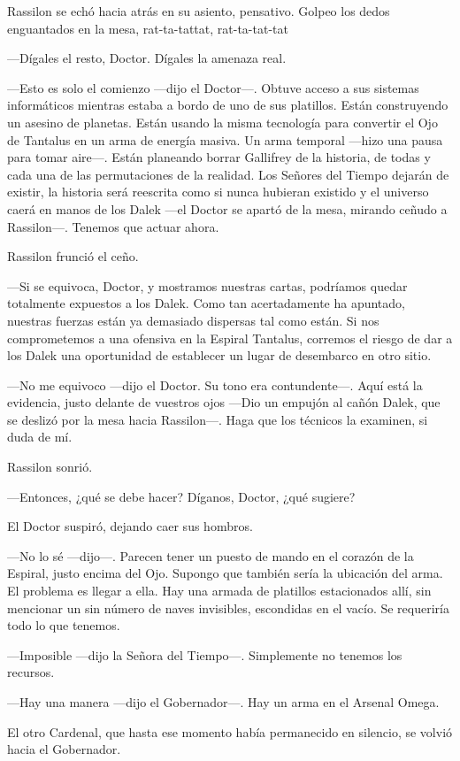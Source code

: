 Rassilon se echó hacia atrás en su asiento, pensativo. Golpeo los dedos enguantados en la mesa, rat-ta-tattat, rat-ta-tat-tat 

—Dígales el resto, Doctor. Dígales la amenaza real.

—Esto es solo el comienzo —dijo el Doctor—. Obtuve acceso a sus sistemas informáticos mientras estaba a bordo de uno de sus platillos. Están construyendo un asesino de planetas. Están usando la misma tecnología para convertir el Ojo de Tantalus en un arma de energía masiva. Un arma temporal —hizo una pausa para tomar aire—. Están planeando borrar Gallifrey de la historia, de todas y cada una de las permutaciones de la realidad. Los Señores del Tiempo dejarán de existir, la historia será reescrita como si nunca hubieran existido y el universo caerá en manos de los Dalek —el Doctor se apartó de la mesa, mirando ceñudo a Rassilon—. Tenemos que actuar ahora.

Rassilon frunció el ceño. 

—Si se equivoca, Doctor, y mostramos nuestras cartas, podríamos quedar totalmente expuestos a los Dalek. Como tan acertadamente ha apuntado, nuestras fuerzas están ya demasiado dispersas tal como están. Si nos comprometemos a una ofensiva en la Espiral Tantalus, corremos el riesgo de dar a los Dalek una oportunidad de establecer un lugar de desembarco en otro sitio. 

—No me equivoco —dijo el Doctor. Su tono era contundente—. Aquí está la evidencia, justo delante de vuestros ojos —Dio un empujón al cañón Dalek, que se deslizó por la mesa hacia Rassilon—. Haga que los técnicos la examinen, si duda de mí.

Rassilon sonrió. 

—Entonces, ¿qué se debe hacer? Díganos, Doctor, ¿qué sugiere?

El Doctor suspiró, dejando caer sus hombros. 

—No lo sé —dijo—. Parecen tener un puesto de mando en el corazón de la Espiral, justo encima del Ojo. Supongo que también sería la ubicación del arma. El problema es llegar a ella. Hay una armada de platillos estacionados allí, sin mencionar un sin número de naves invisibles, escondidas en el vacío. Se requeriría todo lo que tenemos.

—Imposible —dijo la Señora del Tiempo—. Simplemente no tenemos los recursos.

—Hay una manera —dijo el Gobernador—. Hay un arma en el Arsenal Omega.

El otro Cardenal, que hasta ese momento había permanecido en silencio, se volvió hacia el Gobernador. 

